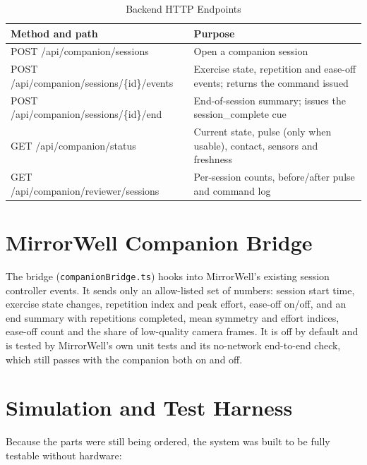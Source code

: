 \documentclass[12pt,letterpaper,oneside]{report}
\begin{document}
\begin{table}[H]
\centering\small{}
\caption{Backend HTTP Endpoints}\label{tab:backend-http-endpoints}
\begin{tabular}{|>{\raggedright\arraybackslash}p{}|>{\raggedright\arraybackslash}p{}|}
\hline
\rowcolor{headgray}\textbf{Method and path} & \textbf{Purpose} \\ \hline
POST /api/companion/sessions & Open a companion session \\ \hline
POST /api/companion/sessions/\{id\}/events & Exercise state, repetition and ease-off events; returns the command issued \\ \hline
POST /api/companion/sessions/\{id\}/end & End-of-session summary; issues the session\_complete cue \\ \hline
GET /api/companion/status & Current state, pulse (only when usable), contact, sensors and freshness \\ \hline
GET /api/companion/reviewer/sessions & Per-session counts, before/after pulse and command log \\ \hline
\end{tabular}
\end{table}

\section{MirrorWell Companion Bridge}\label{sec:5.4}

The bridge (\texttt{companionBridge.ts}) hooks into MirrorWell's existing session controller events. It sends only an allow-listed set of numbers: session start time, exercise state changes, repetition index and peak effort, ease-off on/off, and an end summary with repetitions completed, mean symmetry and effort indices, ease-off count and the share of low-quality camera frames. It is off by default and is tested by MirrorWell's own unit tests and its no-network end-to-end check, which still passes with the companion both on and off.


\section{Simulation and Test Harness}\label{sec:5.5}

Because the parts were still being ordered, the system was built to be fully testable without hardware:
\end{document}
